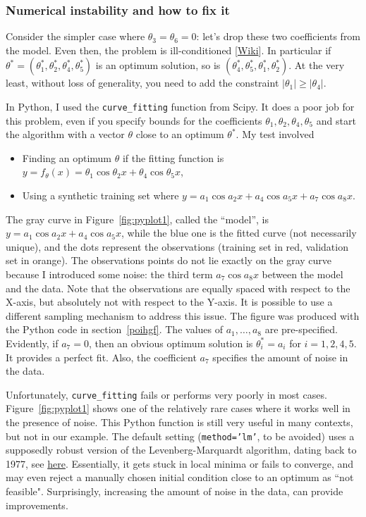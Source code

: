 \documentclass[oneside,10pt]{book}
\begin{document}
\subsubsection{Numerical instability and how to fix it}

Consider the simpler case where $\theta_3=\theta_6=0$: let's drop these two coefficients from the model. Even then,
the problem is \textcolor{index}{ill-conditioned} [\href{https://en.wikipedia.org/wiki/Condition_number}{Wiki}]. In particular if $\theta^*=(\theta_1^*, \theta_2^*,\theta_4^*,\theta_5^*)$ is an optimum solution, so is $(\theta_4^*, \theta_5^*,\theta_1^*,\theta_2^*)$. At the very least,
 without loss of generality, you need to add the
 constraint $|\theta_1|\geq |\theta_4|$.

In Python, I used the \texttt{curve\_fitting} function from Scipy. It does a poor job for this problem, even if you specify bounds for the coefficients
 $\theta_1, \theta_2,\theta_4,\theta_5$ and start the algorithm with a vector $\theta$ close to an optimum $\theta^*$. My test involved
\begin{itemize}
\item Finding an optimum $\theta$ if the fitting function is $y=f_\theta(x) =\theta_1 \cos \theta_2 x +  \theta_4 \cos \theta_5 x$,
\item Using a synthetic training set where  $y=a_1 \cos a_2 x +  a_4 \cos a_5 x + a_7 \cos a_8 x$.
\end{itemize}
 The gray curve in  Figure~\ref{fig:pyplot1}, called the ``model'', is $y=a_1 \cos a_2 x +  a_4 \cos a_5 x$,
 while the blue one is the fitted curve (not necessarily unique), and the dots represent the observations (training set in red, validation set in orange).
The observations points do not lie exactly on the gray curve because I introduced some noise: the third term $a_7 \cos a_8 x$ between the model and the data. Note that the observations are equally spaced with respect to the X-axis, but absolutely not with respect to the Y-axis. It is possible
 to use a different sampling mechanism to address this issue.
 The figure was produced with the Python code in section~\ref{poihgf}. The values of $a_1,\dots,a_8$ are pre-specified. Evidently, if $a_7=0$, then an obvious optimum solution is
 $\theta_i^*=a_i$ for $i=1,2,4,5$. It provides a perfect fit. Also, the coefficient $a_7$ specifies the amount of noise in the data.


Unfortunately,  \texttt{curve\_fitting} fails or performs very poorly in most cases. Figure~\ref{fig:pyplot1} shows one of the relatively rare cases where it
 works well in the presence of noise. This Python function is still very useful in many contexts, but not in our example. The default setting
(\texttt{method='lm'}, to be avoided) uses a supposedly robust version of the Levenberg-Marquardt algorithm, dating back to 1977,
 see \href{https://docs.scipy.org/doc/scipy/reference/generated/scipy.optimize.least_squares.html}{here}. Essentially, it gets stuck in
 local minima or fails to converge, and may even reject a manually chosen initial condition close to an optimum as ``not feasible". Surprisingly,
 increasing the amount of noise in the data, can provide improvements.
\end{document}
